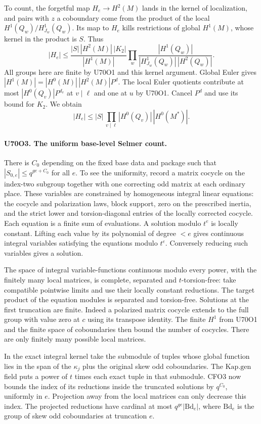 To count, the forgetful map $H_e\to H^2(M)$ lands in the
kernel of localization, and pairs with $z$ a coboundary come
from the product of the local $H^1(Q_w)/H^1_{J_w}(Q_w)$.
Its map to $H_e$ kills restrictions of global $H^1(M)$,
whose kernel in the product is $S$. Thus
\[
 |H_e|\le
 \frac{|S|\,|H^2(M)|\,|K_2|}{|H^1(M)|}
 \prod_w \frac{|H^1(Q_w)|}{|H^1_{J_w}(Q_w)|\,|H^2(Q_w)|}.
\]
All groups here are finite by U70O1 and this kernel argument.
Global Euler gives $|H^1(M)|=|H^0(M)|\,|H^2(M)|P^d$.
The local Euler quotients contribute at most
$|H^0(Q_v)|P^{d_v}$ at $v\mid\ell$ and one at $u$ by
U70O1. Cancel $P^d$ and use its bound for $K_2$. We obtain
\[
          |H_e|\le |S|\,\prod_{v\mid\ell}|H^0(Q_v)|\,
                     |H^0(M^*)|.
\]

\paragraph{U70O3. The uniform base-level Selmer count.}
There is $C_0$ depending on the fixed base data and package such
that $|S_{0,e}|\le q^{ge+C_0}$ for all $e$. To see the uniformity,
record a matrix cocycle on the index-two subgroup together with
one correcting odd matrix at each ordinary place. These variables
are constrained by homogeneous integral linear equations: the
cocycle and polarization laws, block support, zero on the
prescribed inertia, and the strict lower and torsion-diagonal
entries of the locally corrected cocycle. Each equation is a
finite sum of evaluations. A solution modulo $t^e$ is locally
constant. Lifting each value by its polynomial of degree $<e$
gives continuous integral variables satisfying the equations
modulo $t^e$. Conversely reducing such variables gives a solution.

The space of integral variable-functions continuous modulo every
power, with the finitely many local matrices, is complete,
separated and $t$-torsion-free: take compatible pointwise limits
and use their locally constant reductions. The target product of
the equation modules is separated and torsion-free. Solutions at
the first truncation are finite. Indeed a polarized matrix cocycle
extends to the full group with value zero at $c$ using its
transpose identity. The finite $H^1$ from U70O1 and the finite
space of coboundaries then bound the number of cocycles. There
are only finitely many possible local matrices.

In the exact integral kernel take the submodule of tuples whose
global function lies in the span of the $\kappa_j$ plus the
original skew odd coboundaries. The $\mathrm{Kap.gen}$ field
puts a power of $t$ times each exact tuple in that submodule.
CFO3 now bounds the index of its reductions inside the truncated
solutions by $q^{C_0}$, uniformly in $e$. Projection away from
the local matrices can only decrease this index. The projected
reductions have cardinal at most
$q^{ge}|\mathrm{Bd}_e|$, where $\mathrm{Bd}_e$ is the group
of skew odd coboundaries at truncation $e$.

